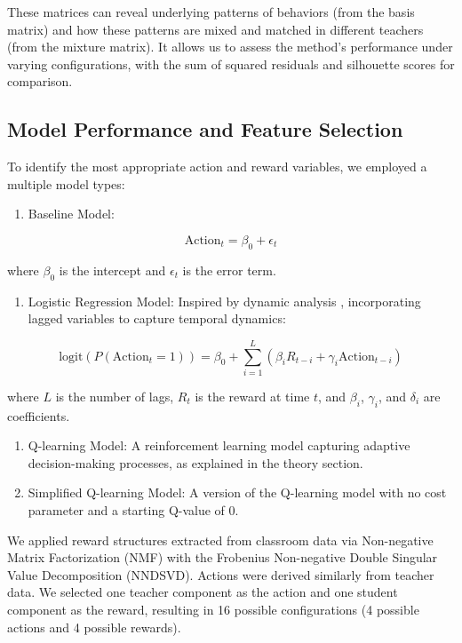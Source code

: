 \documentclass[
  number,
  preprint,
  3p,
  onecolumn]{elsarticle}
\providecommand{\tightlist}{%
  \setlength{\itemsep}{0pt}\setlength{\parskip}{0pt}}\usepackage{longtable,booktabs,array}
\begin{document}
These matrices can reveal underlying patterns of behaviors (from the
basis matrix) and how these patterns are mixed and matched in different
teachers (from the mixture matrix). It allows us to assess the method's
performance under varying configurations, with the sum of squared
residuals and silhouette scores for comparison.

\subsection{Model Performance and Feature
Selection}\label{model-performance-and-feature-selection}

To identify the most appropriate action and reward variables, we
employed a multiple model types:

\begin{enumerate}
\def\labelenumi{\arabic{enumi}.}
\tightlist
\item
  Baseline Model:
\end{enumerate}

\[
\text{Action}_t = \beta_0 + \epsilon_t
\]

where \(\beta_0\) is the intercept and \(\epsilon_t\) is the error term.

\begin{enumerate}
\def\labelenumi{\arabic{enumi}.}
\setcounter{enumi}{1}
\tightlist
\item
  Logistic Regression Model: Inspired by dynamic analysis
  \citep{lau2005}, incorporating lagged variables to capture temporal
  dynamics:
\end{enumerate}

\[
\text{logit}(P(\text{Action}_t = 1)) = \beta_0 + \sum_{i=1}^{L} (\beta_i R_{t-i} + \gamma_i \text{Action}_{t-i})
\]

where \(L\) is the number of lags, \(R_t\) is the reward at time \(t\),
and \(\beta_i\), \(\gamma_i\), and \(\delta_i\) are coefficients.

\begin{enumerate}
\def\labelenumi{\arabic{enumi}.}
\setcounter{enumi}{2}
\item
  Q-learning Model: A reinforcement learning model capturing adaptive
  decision-making processes, as explained in the theory section.
\item
  Simplified Q-learning Model: A version of the Q-learning model with no
  cost parameter and a starting Q-value of 0.
\end{enumerate}

We applied reward structures extracted from classroom data via
Non-negative Matrix Factorization (NMF) with the Frobenius Non-negative
Double Singular Value Decomposition (NNDSVD). Actions were derived
similarly from teacher data. We selected one teacher component as the
action and one student component as the reward, resulting in 16 possible
configurations (4 possible actions and 4 possible rewards).
\end{document}
